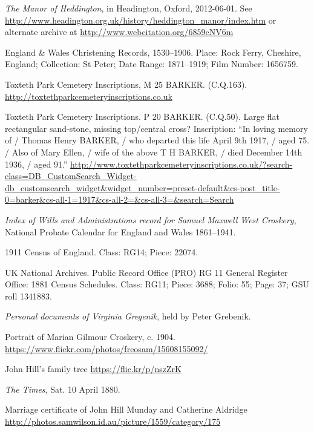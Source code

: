\begin{thebibliography}{99}
	\emph{The Manor of Heddington}, in Headington, Oxford, 2012-06-01.
	See \url{http://www.headington.org.uk/history/heddington_manor/index.htm} or alternate archive at \url{http://www.webcitation.org/6859cNV6m}

	England \& Wales Christening Records, 1530--1906.
	Place: Rock Ferry, Cheshire, England; Collection: St Peter; Date Range: 1871--1919; Film Number: 1656759.

	Toxteth Park Cemetery Inscriptions, M 25 BARKER. (C.Q.163). \url{http://toxtethparkcemeteryinscriptions.co.uk}

	Toxteth Park Cemetery Inscriptions. P 20 BARKER. (C.Q.50).
	Large flat rectangular sand-stone, missing top/central cross? Inscription:
	``In loving memory of / Thomas Henry BARKER, / who departed this life April 9th 1917, / aged 75. /
	Also of Mary Ellen, / wife of the above T H BARKER, / died December 14th 1936, / aged 91.''
	\url{http://www.toxtethparkcemeteryinscriptions.co.uk/?search-class=DB_CustomSearch_Widget-db_customsearch_widget&widget_number=preset-default&cs-post_title-0=barker&cs-all-1=1917&cs-all-2=&cs-all-3=&search=Search}

	\emph{Index of Wills and Administrations record for Samuel Maxwell West Croskery},
	National Probate Calendar for England and Wales 1861--1941.

	1911 Census of England. Class: RG14; Piece: 22074.

	UK National Archives. Public Record Office (PRO) RG 11 General Register Office: 1881 Census Schedules.
	Class: RG11; Piece: 3688; Folio: 55; Page: 37; GSU roll 1341883.

	\emph{Personal documents of Virginia Gregenik}, held by Peter Grebenik.

	Portrait of Marian Gilmour Croskery, c. 1904.
	\url{https://www.flickr.com/photos/freosam/15608155092/}

	John Hill's family tree \url{https://flic.kr/p/nszZrK}

	\emph{The Times}, Sat. 10 April 1880. 

	Marriage certificate of John Hill Munday and Catherine Aldridge
	\url{http://photos.samwilson.id.au/picture/1559/category/175}


\end{thebibliography}
